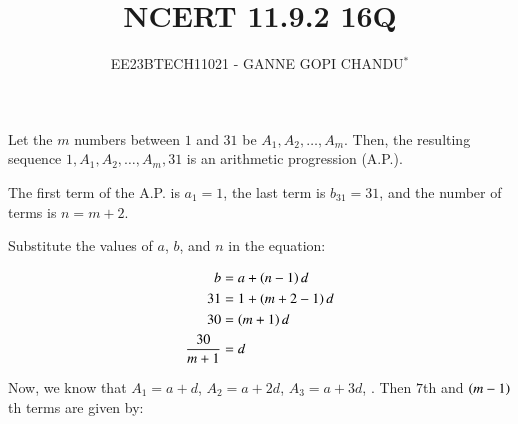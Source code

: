 \documentclass[journal,12pt,twocolumn]{IEEEtran}
\theoremstyle{remark}
\begin{document}

\vspace{3cm}

\title{NCERT 11.9.2 16Q}
\author{EE23BTECH11021 - GANNE GOPI CHANDU$^{*}$%
}
\maketitle
\newpage
\bigskip

\renewcommand{\thefigure}{\theenumi}
\renewcommand{\thetable}{\theenumi}


Let the $m$ numbers between $1$ and $31$ be $A_1, A_2, \ldots, A_{m}$. Then, the resulting sequence $1, A_1, A_2, \ldots, A_{m}, 31$ is an arithmetic progression (A.P.).

The first term of the A.P. is $a_1 = 1$, the last term is $b_{31} = 31$, and the number of terms is $n = m + 2$. 

Substitute the values of $a$, $b$, and $n$ in the equation:

\begin{align}
 b &= a + \left(n-1\right)d \\
31 &= 1 + \left(m + 2 - 1\right)d \\
30 &= \left(m + 1\right)d \\
\frac{30}{m + 1} &= d 
\end{align}

Now, we know that $A_1 = a + d$, $A_2 = a + 2d$, $A_3 = a + 3d$, . Then $7$th and $\left(m-1\right)$th terms are given by:
\end{document}
